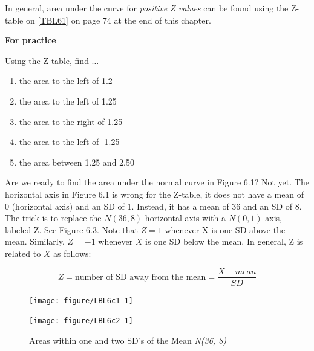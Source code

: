 \documentclass[11pt, chapterprefix=true]{scrbook}\usepackage[]{graphicx}\usepackage[]{color}
\begin{document}
In general, area under the curve for \textit{positive Z values} can be found using the Z-table on \ref{TBL61} on page 74 at the end of this chapter.  

\begin{minipage}[ht]{3cm}

\textbf{For practice}
\end{minipage}
\begin{minipage}[ht]{6cm}

\parbox{6cm}{
  Using the Z-table, find $\dots$

  \begin{enumerate}
  \item the area to the left of 1.2
  \item the area to the left of 1.25
  \item the area to the right of 1.25
  \item the area to the left of -1.25
  \item the area between 1.25 and 2.50
  \end{enumerate}
}
\end{minipage}

Are we ready to find the area under the normal curve in Figure 6.1?  Not yet.  The horizontal axis in Figure 6.1 is wrong for the Z-table, it does not have a mean of 0 (horizontal axis) and an SD of 1. Instead, it has a mean of 36 and an SD of 8.  The trick is to replace the $N(36, 8)$ horizontal axis with a $N(0, 1)$ axis, labeled Z.  See Figure 6.3.  Note that $Z = 1$ whenever X is one SD above the mean.  Similarly, $Z = -1$ whenever $X$ is one SD below the mean.  In general, Z is related to $X$ as follows:

  \begin{equation} Z = \text{number of SD away from the mean} = \frac{X - mean}{SD} \end{equation}

\begin{figure}[ht]

\caption{Areas within one and two SD's of the Mean \textit{N(36, 8)}}

\begin{minipage}[ht]{7cm}



{\centering \texttt{[image: figure/LBL6c1-1]} 

}



\end{minipage}
\begin{minipage}[ht]{7cm}


{\centering \texttt{[image: figure/LBL6c2-1]} 

}



\end{minipage}
\end{figure}
\end{document}
